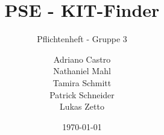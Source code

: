\title{
    PSE - KIT-Finder
}
\subtitle{Pflichtenheft - Gruppe 3}
\author{
    Adriano Castro \\
    Nathaniel Mahl \\
    Tamira Schmitt \\
    Patrick Schneider \\
    Lukas Zetto
}

\date{\today}

\maketitle
